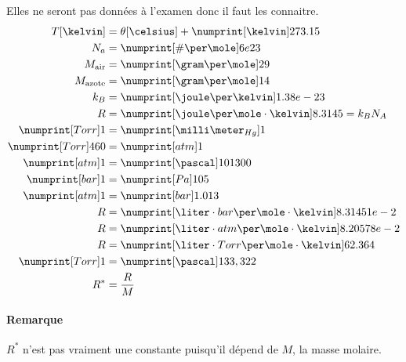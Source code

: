 Elles ne seront pas données à l'examen donc il faut les connaitre.
\begin{align*}
  T[\kelvin] & = \theta[\celsius] + \si{273.15}{\kelvin}\\
  N_a & = \si{6e23}{\#\per\mole}\\
  M_\mathrm{air} & = \si{29}{\gram\per\mole}\\
  M_\mathrm{azote} & = \si{14}{\gram\per\mole}\\
  k_B & = \si{1.38e-23}{\joule\per\kelvin}\\
  R & = \si{8.3145}{\joule\per\mole\cdot\kelvin} = k_B N_A\\
  \si{1}{Torr} & = \si{1}{\milli\meter_{Hg}}\\
  \si{460}{Torr} & = \si{1}{atm}\\
  \si{1}{atm} & = \si{101300}{\pascal}\\
  \si{1}{bar} & = \si{105}{Pa}\\ %
  \si{1}{atm} & = \si{1.013}{bar}\\
  R & = \si{8.31451e-2}{\liter\cdot bar\per\mole\cdot\kelvin}\\
  R & = \si{8.20578e-2}{\liter\cdot atm\per\mole\cdot\kelvin}\\
  R & = \si{62.364}{\liter\cdot Torr\per\mole\cdot\kelvin}\\
  \si{1}{Torr} & = \si{133,322}{\pascal}\\
  R^* & = \frac{R}{M}
\end{align*}

\paragraph{Remarque}
$R^*$ n'est pas vraiment une constante puisqu'il dépend de $M$,
la masse molaire.



